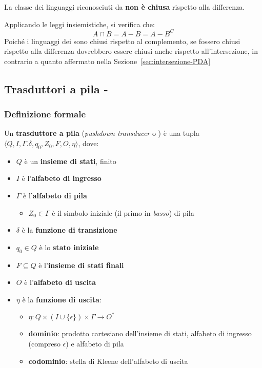 \documentclass[italian, 10pt]{article}
\begin{document}
La classe dei linguaggi riconosciuti da \PDA \textbf{non è chiusa} rispetto alla differenza.

Applicando le leggi insiemistiche, si verifica che:
\[ A \cap B = A - \overline{B} = A - B^C \]
Poiché i linguaggi dei \PDA sono chiusi rispetto al complemento, se fossero chiusi rispetto alla differenza dovrebbero essere chiusi anche rispetto all'intersezione, in contrario a quanto affermato nella Sezione~\ref{sec:intersezione-PDA}

\subsection{Trasduttori a pila - \PDT}

\subsubsection{Definizione formale \PDT}

Un \textbf{trasduttore a pila} (\textit{pushdown transducer} o \PDT) è una tupla \(\langle Q, I, \Gamma. \delta, q_0, Z_0, F, O, \eta \rangle\), dove:

\begin{itemize}
  \item \(Q\) è un \textbf{insieme di stati}, finito
  \item \(I\) è l'\textbf{alfabeto di ingresso}
  \item \(\Gamma\) è l'\textbf{alfabeto di pila}
        \begin{itemize}
          \item \(Z_0 \in \Gamma\) è il simbolo iniziale (il primo in \textit{basso}) di pila
        \end{itemize}
  \item \(\delta\) è la \textbf{funzione di transizione}
  \item \(q_0 \in Q\) è lo \textbf{stato iniziale}
  \item \(F \subseteq Q\) è l'\textbf{insieme di stati finali}
  \item \(O\) è l'\textbf{alfabeto di uscita}
  \item \(\eta\) è la \textbf{funzione di uscita}:
        \begin{itemize}
          \item \(\eta: Q \times \left(I \cup \{ \epsilon \}\right) \times \Gamma \rightarrow O^\ast\)
          \item \textbf{dominio}: prodotto cartesiano dell'insieme di stati, alfabeto di ingresso (compreso \(\epsilon\)) e alfabeto di pila
          \item \textbf{codominio}: stella di Kleene dell'alfabeto di uscita
        \end{itemize}
\end{itemize}
\end{document}

